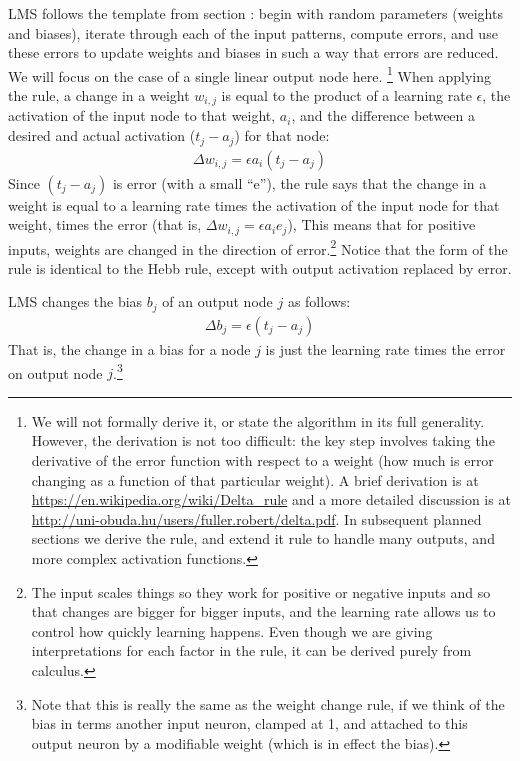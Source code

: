 LMS follows the template from section : begin with random parameters (weights and biases), iterate through each of the input patterns, compute errors, and use these errors to update weights and biases in such a way that errors are reduced. We will focus on the case of a single linear output node here. \footnote{We will not formally derive it, or state the algorithm in its full generality. However, the derivation is not too difficult: the key step involves taking the derivative of the error function with respect to a weight (how much is error changing as a function of that particular weight). A brief derivation is at \url{https://en.wikipedia.org/wiki/Delta_rule} and a more detailed discussion is at \url{http://uni-obuda.hu/users/fuller.robert/delta.pdf}. In subsequent planned sections we derive the rule, and extend it rule to handle many outputs, and more complex activation functions.} When applying the rule, a change in a weight $w_{i,j}$ is equal to the product of a learning rate $\epsilon$, the activation of the input node to that weight, $a_i$, and the difference between a desired and actual activation ($t_j - a_j$) for that node:
\begin{eqnarray*}
\Delta w_{i,j}  =  \epsilon a_i (t_j - a_j)
\end{eqnarray*}
Since $(t_j - a_j)$ is error  (with a small ``e''), the rule says that the change in a weight is equal to a learning rate times the activation of the input node for that weight, times the error (that is, $\Delta w_{i,j}  =  \epsilon a_i e_j$),  This means that for positive inputs, weights are changed in the direction of error.\footnote{The input scales things so they work for positive or negative inputs and so that changes are bigger for bigger inputs, and the learning rate allows us to control how quickly learning happens. Even though we are giving interpretations for each factor in the rule, it can be derived purely from calculus.} Notice that the form of the rule is identical to the Hebb rule, except with output activation replaced by error. 

LMS changes the bias $b_j$ of an output node $j$ as follows: 
\begin{eqnarray*}
\Delta b_j  =  \epsilon (t_j - a_j)
\end{eqnarray*}
That is, the change in a bias for a node $j$ is just the learning rate times the error on output node $j$.\footnote{Note that this is really the same as the weight change rule, if we think of the bias in terms another input neuron, clamped at 1, and attached to this output neuron by a modifiable weight (which is in effect the bias).}

